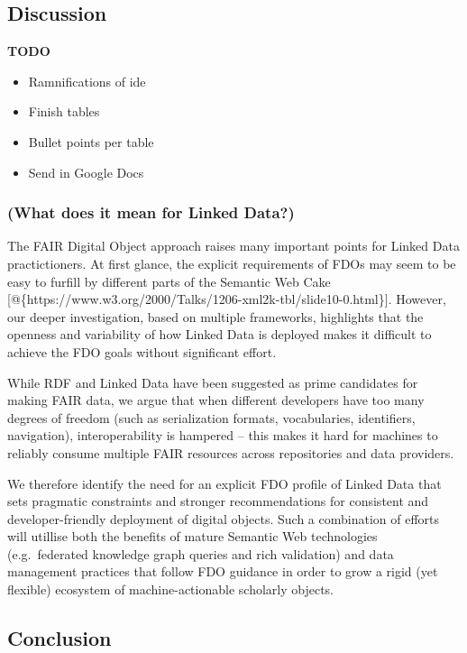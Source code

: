 \hypertarget{sec:discussion}{%
\subsection{Discussion}\label{sec:discussion}}

\textbf{TODO}

\begin{itemize}
\tightlist
\item
  Ramnifications of ide
\item
  Finish tables
\item
  Bullet points per table
\item
  Send in Google Docs
\end{itemize}

\hypertarget{what-does-it-mean-for-linked-data}{%
\subsubsection{(What does it mean for Linked
Data?)}\label{what-does-it-mean-for-linked-data}}

The FAIR Digital Object approach raises many important points for Linked
Data practictioners. At first glance, the explicit requirements of FDOs
may seem to be easy to furfill by different parts of the Semantic Web
Cake
{[}@\{https://www.w3.org/2000/Talks/1206-xml2k-tbl/slide10-0.html\}{]}.
However, our deeper investigation, based on multiple frameworks,
highlights that the openness and variability of how Linked Data is
deployed makes it difficult to achieve the FDO goals without significant
effort.

While RDF and Linked Data have been suggested as prime candidates for
making FAIR data, we argue that when different developers have too many
degrees of freedom (such as serialization formats, vocabularies,
identifiers, navigation), interoperability is hampered -- this makes it
hard for machines to reliably consume multiple FAIR resources across
repositories and data providers.

We therefore identify the need for an explicit FDO profile of Linked
Data that sets pragmatic constraints and stronger recommendations for
consistent and developer-friendly deployment of digital objects. Such a
combination of efforts will utillise both the benefits of mature
Semantic Web technologies (e.g.~federated knowledge graph queries and
rich validation) and data management practices that follow FDO guidance
in order to grow a rigid (yet flexible) ecosystem of machine-actionable
scholarly objects.

\hypertarget{conclusion}{%
\subsection{Conclusion}\label{conclusion}}
